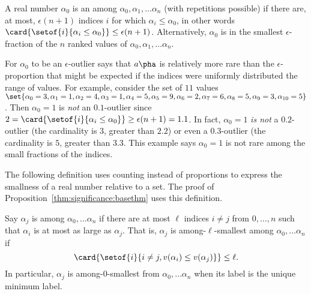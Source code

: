 \documentclass[12pt]{article}
\begin{document}
\begin{definition}
    A real number \( \alpha_0 \) is an %
    among \( \alpha_0, \alpha_1, \dots \alpha_n \) (with repetitions
    possible) if there are, at most, \( \epsilon(n + 1) \) indices \( i \)
    for which \( \alpha_i \le \alpha_0 \), in other words \( \card{%
    \setof{i}{\alpha_i \le \alpha_0}} \le \epsilon(n+1) \).
    Alternatively, \( \alpha_0 \) is in the smallest \( \epsilon \)-fraction
    of the \( n \) ranked values of \( \alpha_0, \alpha_1, \dots \alpha_n \).
  \end{definition}

  \begin{remark}
    For \( \alpha_0 \) to be an \( \epsilon \)-outlier says that \(
    a\pha \) is relatively more rare than the \( \epsilon
    \)-proportion that might be expected if the indices were uniformly
    distributed the range of values.     For example, consider the set of \( 11 \) values
    \( \set{\alpha_0 = 3, \alpha_1 = 1, \alpha_2 = 4, \alpha_3 = 1,
      \alpha_4 = 5, \alpha_5 = 9, \alpha_6 = 2, \alpha_7 = 6, \alpha_8
      = 5, \alpha_9 = 3, \alpha_{10} = 5} \).  Then \(
    \alpha_0 = 1 \) is \emph{not} an \( 0.1 \)-outlier since \( 2 =
    \card{%
    \setof{i}{\alpha_i \le \alpha_0}} \ge \epsilon(n+1) = 1.1 \).  In
  fact,  \( \alpha_0 = 1 \) \emph{is not} a \( 0.2 \)-outlier (the
  cardinality is \( 3 \), greater than \(2.2\))
  or even a \( 0.3 \)-outlier (the cardinality is \( 5 \), greater
  than \( 3.3 \).   This example says \( \alpha_0 = 1 \) is not
  rare among the small fractions of the indices.

  \end{remark}

The following definition uses counting instead of proportions to express
the smallness of a real number relative to a set.  The proof of 
Proposition~\ref{thm:significance:basethm}  uses this definition.

\begin{definition}
    Say \( \alpha_j \) is %
    among \( \alpha_0, \dots \alpha_n \) if there are at most \( \ell \)
    indices \( i \ne j \) from \( 0, \dots, n \) such that  \(
    \alpha_i \) is at most as large as \( \alpha_j \).  That is, \(
    \alpha_j \) is among-\( \ell \)-smallest among \( \alpha_0, \dots
    \alpha_n \) if
    \[
      \card{ \setof{i}{i \ne j, v(\alpha_i) \le v(\alpha_j)}}
      \le \ell.
    \]  In particular, \( \alpha_j \) is among-\( 0 \)-smallest
    from \( \alpha_0, \dots \alpha_n \) when its label is the unique
    minimum label.
\end{definition}
\end{document}
